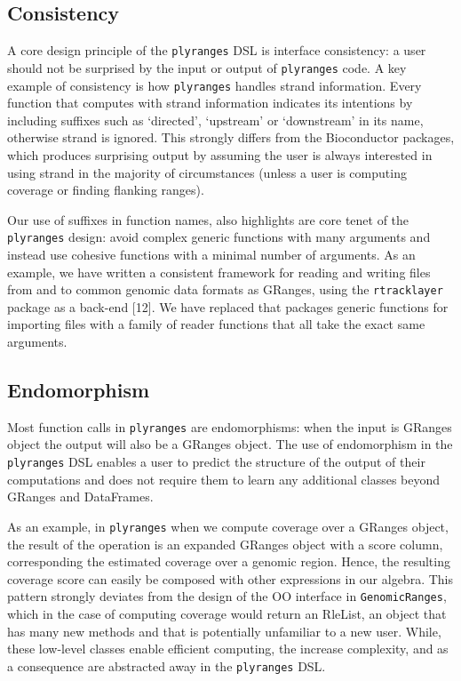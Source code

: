 \documentclass[10pt,letterpaper]{article}
\begin{document}
\subsection{Consistency}\label{consistency}

A core design principle of the \texttt{plyranges} DSL is interface
consistency: a user should not be surprised by the input or output of
\texttt{plyranges} code. A key example of consistency is how
\texttt{plyranges} handles strand information. Every function that
computes with strand information indicates its intentions by including
suffixes such as `directed', `upstream' or `downstream' in its name,
otherwise strand is ignored. This strongly differs from the Bioconductor
packages, which produces surprising output by assuming the user is
always interested in using strand in the majority of circumstances
(unless a user is computing coverage or finding flanking ranges).

Our use of suffixes in function names, also highlights are core tenet of
the \texttt{plyranges} design: avoid complex generic functions with many
arguments and instead use cohesive functions with a minimal number of
arguments. As an example, we have written a consistent framework for
reading and writing files from and to common genomic data formats as
GRanges, using the \texttt{rtracklayer} package as a back-end {[}12{]}.
We have replaced that packages generic functions for importing files
with a family of reader functions that all take the exact same
arguments.

\subsection{Endomorphism}\label{endomorphism}

Most function calls in \texttt{plyranges} are endomorphisms: when the
input is GRanges object the output will also be a GRanges object. The
use of endomorphism in the \texttt{plyranges} DSL enables a user to
predict the structure of the output of their computations and does not
require them to learn any additional classes beyond GRanges and
DataFrames.

As an example, in \texttt{plyranges} when we compute coverage over a
GRanges object, the result of the operation is an expanded GRanges
object with a score column, corresponding the estimated coverage over a
genomic region. Hence, the resulting coverage score can easily be
composed with other expressions in our algebra. This pattern strongly
deviates from the design of the OO interface in \texttt{GenomicRanges},
which in the case of computing coverage would return an RleList, an
object that has many new methods and that is potentially unfamiliar to a
new user. While, these low-level classes enable efficient computing, the
increase complexity, and as a consequence are abstracted away in the
\texttt{plyranges} DSL.
\end{document}
